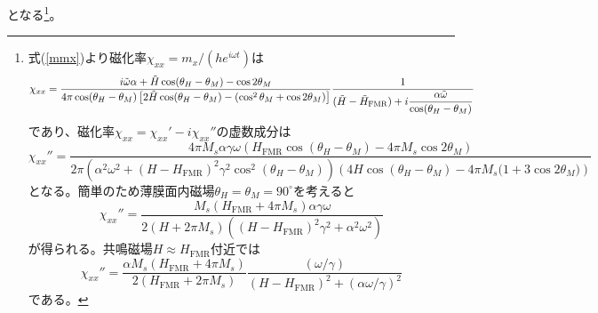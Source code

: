 となる\footnote{式(\ref{mmx})より磁化率$\chi_{xx}=m_x/(he^{i\omega t} )$は
\begin{equation}
\chi_{xx} = \frac{{ {i\tilde \omega \alpha  + {\tilde H\cos (\theta_H  - \theta_M ) - \cos 2\theta_M } } }}{{4\pi \cos (\theta_H  - \theta_M )\left[ {2\tilde H\cos (\theta_H  - \theta_M ) - \left( {\cos^ 2\theta_M  + \cos 2 \theta_M } \right)} \right]}}\frac{1}{{{\rm{ }}(\tilde H - \tilde H_{{\rm{FMR}}} ) + i\dfrac{{\alpha \tilde \omega }}{{\cos (\theta_H  - \theta_M )}}}} \nonumber\label{chi1}
\end{equation}
であり、磁化率$\chi_{xx}=\chi_{xx}'-i\chi_{xx}''$の虚数成分は
\begin{equation}
\chi_{xx} '' = \frac{{4\pi {M_s}\alpha \gamma \omega \left( {{H_\text{FMR}}\cos ({\theta _H} - {\theta _M}) - 4\pi {M_s}\cos 2{\theta _M}} \right)}}{{2\pi \left( {{\alpha ^2}{\omega ^2} + {{(H - {H_\text{FMR}})}^2}{\gamma ^2}{{\cos }^2}({\theta _H} - {\theta _M})} \right)\left( {4H\cos ({\theta _H} - {\theta _M}) - 4\pi {M_s}(1+3\cos 2{\theta _M}}) \right)}}\label{chi2}\nonumber
\end{equation}
となる。簡単のため薄膜面内磁場$\theta_H=\theta_M=90^\circ$を考えると
\begin{equation}
\chi _{xx}'' = \frac{{{M_s}\left( {{H_\text{FMR}} + 4\pi {M_s}} \right)\alpha \gamma \omega }}{2{\left( H + 2\pi {M_s} \right)\left( { {{(H - {H_\text{FMR}})}^2}{\gamma ^2}+{\alpha ^2}{\omega ^2} } \right)}}
\end{equation}
が得られる。共鳴磁場$H\approx H_\text{FMR}$付近では
\begin{equation}
\chi _{xx}'' = \frac{\alpha{M_s}\left( H_\text{FMR} + 4\pi {M_s} \right)  }{2\left( H_\text{FMR} + 2\pi {M_s}  \right)}\frac{\left(\omega/\gamma\right)}{ (H - {H_\text{FMR}})^2+\left(\alpha\omega/\gamma\right)^2}\label{chi3}
\end{equation}
である。
}。

